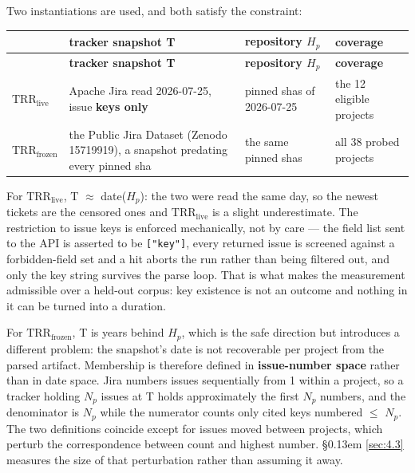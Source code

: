 \documentclass[11pt,a4paper]{article}
\begin{document}
Two instantiations are used, and both satisfy the constraint:

\begingroup\footnotesize\setlength{\tabcolsep}{3pt}
\begin{longtable}{>{\raggedright\arraybackslash}p{}>{\raggedright\arraybackslash}p{}>{\raggedright\arraybackslash}p{}>{\raggedright\arraybackslash}p{}}
\toprule
\textbf{} & \textbf{tracker snapshot T} & \textbf{repository $H_p$} & \textbf{coverage} \\
\midrule
\endfirsthead
\toprule
\textbf{} & \textbf{tracker snapshot T} & \textbf{repository $H_p$} & \textbf{coverage} \\
\midrule
\endhead
\bottomrule
\endlastfoot
\textbf{$\mathrm{TRR}_\mathrm{live}$} & Apache Jira read 2026-\allowbreak{}07-\allowbreak{}25, issue \textbf{keys only} & pinned shas of 2026-\allowbreak{}07-\allowbreak{}25 & the 12 eligible projects \\
\textbf{$\mathrm{TRR}_\mathrm{frozen}$} & the Public Jira Dataset \cite{montgomery2025jira} (Zenodo 15719919), a snapshot predating every pinned sha & the same pinned shas & all 38 probed projects \\
\end{longtable}
\addtocounter{table}{-1}
\endgroup

For \textbf{$\mathrm{TRR}_\mathrm{live}$}, T $\approx$ date($H_p$): the two were read the same day, so the newest tickets are the censored ones and $\mathrm{TRR}_\mathrm{live}$ is a slight underestimate. The restriction to issue keys is enforced mechanically, not by care --- the field list sent to the API is asserted to be \texttt{["key"]}, every returned issue is screened against a forbidden-field set and a hit aborts the run rather than being filtered out, and only the key string survives the parse loop. That is what makes the measurement admissible over a held-out corpus: key existence is not an outcome and nothing in it can be turned into a duration.

For \textbf{$\mathrm{TRR}_\mathrm{frozen}$}, T is years behind $H_p$, which is the safe direction but introduces a different problem: the snapshot's date is not recoverable per project from the parsed artifact. Membership is therefore defined in \textbf{issue-number space} rather than in date space. Jira numbers issues sequentially from 1 within a project, so a tracker holding $N_p$ issues at T holds approximately the first $N_p$ numbers, and the denominator is $N_p$ while the numerator counts only cited keys numbered $\leq$ $N_p$. The two definitions coincide except for issues moved between projects, which perturb the correspondence between count and highest number. \S\kern0.13em \ref{sec:4.3} measures the size of that perturbation rather than assuming it away.
\end{document}
